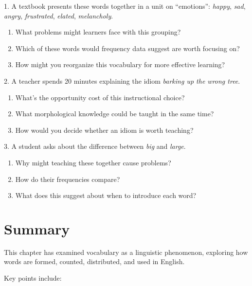 \begin{tcolorbox}[title=Exercise: Avoiding Common Pitfalls, colback=white, colframe=red!75!black, fonttitle=\bfseries]
1. A textbook presents these words together in a unit on ``emotions'': \textit{happy}, \textit{sad}, \textit{angry}, \textit{frustrated}, \textit{elated}, \textit{melancholy}.
  \begin{enumerate}[nosep]
  \item What problems might learners face with this grouping?
  \item Which of these words would frequency data suggest are worth focusing on?
  \item How might you reorganize this vocabulary for more effective learning?
  \end{enumerate}

2. A teacher spends 20 minutes explaining the idiom \textit{barking up the wrong tree}.
  \begin{enumerate}[nosep]
  \item What's the opportunity cost of this instructional choice?
  \item What morphological knowledge could be taught in the same time?
  \item How would you decide whether an idiom is worth teaching?
  \end{enumerate}

3. A student asks about the difference between \textit{big} and \textit{large}.
  \begin{enumerate}[nosep]
  \item Why might teaching these together cause problems?
  \item How do their frequencies compare?
  \item What does this suggest about when to introduce each word?
  \end{enumerate}
\end{tcolorbox}

\section{Summary}

This chapter has examined vocabulary as a linguistic phenomenon, exploring how words are formed, counted, distributed, and used in English.

Key points include:

